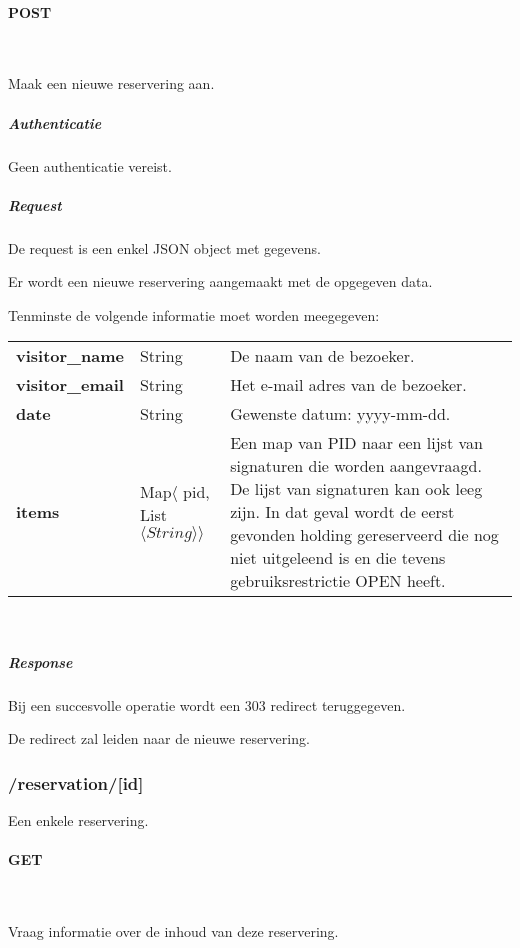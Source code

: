 \documentclass[a4paper,titlepage]{report}
\makeatletter
\def\namedlabel#1#2{
  \label{#1}
  \begingroup
   \def\@currentlabel{#2}%
   \label{#1:name}\endgroup
}
\makeatother
\begin{document}
        \paragraph{POST}\hfill\\
          \namedlabel{api:reservation-list:post}{POST /reservation/}
          Maak een nieuwe reservering aan.

          \subparagraph{Authenticatie}
            Geen authenticatie vereist.

          \subparagraph{Request}
            De request is een enkel JSON object met gegevens.

            Er wordt een nieuwe reservering aangemaakt met de opgegeven data.

            Tenminste de volgende informatie moet worden meegegeven:\\

            \begin{tabular}{ l l p{10cm} }
              \textbf{visitor\_name} & String & De naam van de bezoeker. \\
              \textbf{visitor\_email} & String & Het e-mail adres van de
               bezoeker. \\
              \textbf{date} & String & Gewenste datum: yyyy-mm-dd. \\
              \textbf{items} & Map$\langle$ pid, List$\langle String
                \rangle\rangle$ & Een map van PID naar een lijst van signaturen
                die worden aangevraagd. De lijst van signaturen kan ook leeg
                zijn. In dat geval wordt de eerst gevonden holding gereserveerd die nog niet
                uitgeleend is en die tevens gebruiksrestrictie OPEN heeft. \\
            \end{tabular}\hfill\\

          \subparagraph{Response}
            Bij een succesvolle operatie wordt een 303 redirect teruggegeven.

            De redirect zal leiden naar de nieuwe reservering.


      \pagebreak
      \subsubsection{/reservation/[id]}
      Een enkele reservering.

        \paragraph{GET}\hfill\\
          \namedlabel{api:reservation:get}{GET /reservation/[id]}
          Vraag informatie over de inhoud van deze reservering.
\end{document}
